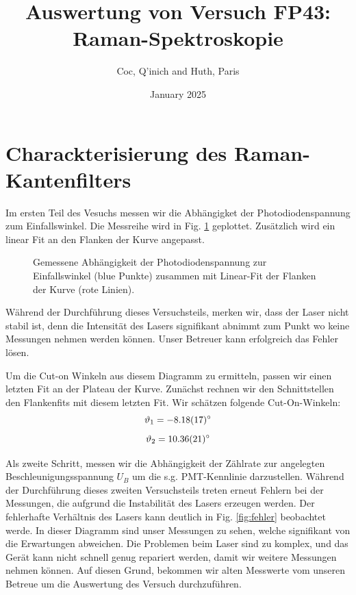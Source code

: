 \documentclass[11 pt]{article}
\title{Auswertung von Versuch FP43: Raman-Spektroskopie}
\author{Coc, Q'inich and Huth, Paris}
\date{January 2025}
\begin{document}
\maketitle
\section{Charackterisierung des Raman-Kantenfilters}
Im ersten Teil des Vesuchs messen wir  die Abhängigket der Photodiodenspannung zum Einfallswinkel. Die Messreihe wird in Fig. \ref{fig:justierung} geplottet. Zusätzlich wird ein linear Fit an den Flanken der Kurve angepasst. 

\begin{figure}[htbp]
	\centering
   \caption{Gemessene Abhängigkeit der Photodiodenspannung zur Einfallswinkel (blue Punkte) zusammen mit Linear-Fit der Flanken der Kurve (rote Linien).}
   \label{fig:justierung}
\end{figure}

Während der Durchführung dieses Versuchsteils, merken wir, dass der Laser nicht stabil ist, denn die Intensität des Lasers signifikant abnimmt zum Punkt wo keine Messungen nehmen werden können. Unser Betreuer kann erfolgreich das Fehler lösen. 

Um die Cut-on Winkeln aus diesem Diagramm zu ermitteln, passen wir einen letzten Fit an der Plateau der Kurve. Zunächst rechnen wir den Schnittstellen den Flankenfits mit diesem letzten Fit. Wir schätzen folgende Cut-On-Winkeln:
$$\vartheta_1 =  \SI{-8.18\pm 0.17}{\degree}$$ 
$$\vartheta_2 =  \SI{10.36\pm 0.21}{\degree}$$ 

Als zweite Schritt, messen wir die Abhängigkeit der Zählrate zur  angelegten Beschleunigungsspannung $U_B$ um die s.g. PMT-Kennlinie darzustellen. Während der Durchführung dieses zweiten Versuchsteils treten erneut Fehlern bei der Messungen, die aufgrund die Instabilität des Lasers erzeugen werden. Der fehlerhafte Verhältnis des Lasers kann deutlich in Fig. \ref{fig:fehler} beobachtet werde. In dieser Diagramm sind unser Messungen zu sehen, welche signifikant von die Erwartungen abweichen. Die Problemen beim Laser sind zu komplex, und das Gerät kann nicht schnell genug repariert werden, damit wir weitere Messungen nehmen können. Auf diesen Grund, bekommen wir alten Messwerte vom unseren Betreue um die Auswertung des Versuch durchzuführen.  
\end{document}
